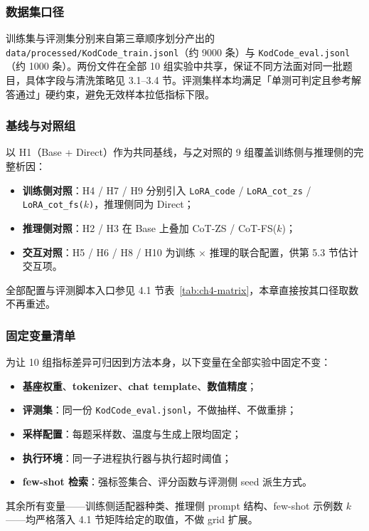 
\subsubsection{数据集口径}
训练集与评测集分别来自第三章顺序划分产出的 \texttt{data/processed/KodCode\_\allowbreak train.jsonl}（约 9000 条）与 \texttt{KodCode\_eval.jsonl}（约 1000 条）。两份文件在全部 10 组实验中共享，保证不同方法面对同一批题目，具体字段与清洗策略见 3.1--3.4 节。评测集样本均满足「单测可判定且参考解答通过」硬约束，避免无效样本拉低指标下限。

\subsubsection{基线与对照组}
以 H1（Base + Direct）作为共同基线，与之对照的 9 组覆盖训练侧与推理侧的完整析因：
\begin{itemize}
    \item \textbf{训练侧对照}：H4 / H7 / H9 分别引入 \texttt{LoRA\_code} / \texttt{LoRA\_cot\_zs} / \texttt{LoRA\_cot\_fs($k$)}，推理侧同为 Direct；
    \item \textbf{推理侧对照}：H2 / H3 在 Base 上叠加 CoT-ZS / CoT-FS($k$)；
    \item \textbf{交互对照}：H5 / H6 / H8 / H10 为训练 $\times$ 推理的联合配置，供第 5.3 节估计交互项。
\end{itemize}
全部配置与评测脚本入口参见 4.1 节表~\ref{tab:ch4-matrix}，本章直接按其口径取数不再重述。

\subsubsection{固定变量清单}
为让 10 组指标差异可归因到方法本身，以下变量在全部实验中固定不变：
\begin{itemize}
    \item \textbf{基座权重}、\textbf{tokenizer}、\textbf{chat template}、\textbf{数值精度}；
    \item \textbf{评测集}：同一份 \texttt{KodCode\_eval.jsonl}，不做抽样、不做重排；
    \item \textbf{采样配置}：每题采样数、温度与生成上限均固定；
    \item \textbf{执行环境}：同一子进程执行器与执行超时阈值；
    \item \textbf{few-shot 检索}：强标签集合、评分函数与评测侧 seed 派生方式。
\end{itemize}
其余所有变量——训练侧适配器种类、推理侧 prompt 结构、few-shot 示例数 $k$——均严格落入 4.1 节矩阵给定的取值，不做 grid 扩展。